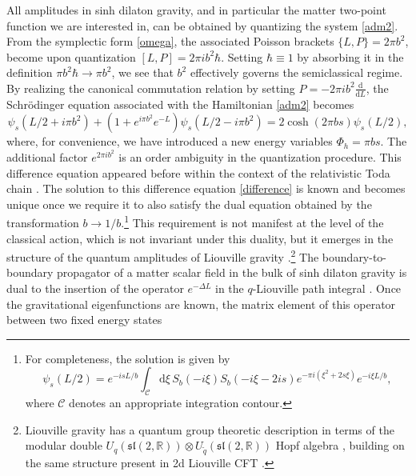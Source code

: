 \documentclass[a4paper,titlepage,12pt]{article}
\numberwithin{equation}{section}
\begin{document}
All amplitudes in sinh dilaton gravity, and in particular the matter two-point function we are interested in, can be obtained by quantizing the system \eqref{adm2}. From the symplectic form \eqref{omega}, the associated Poisson brackets $\{L,P\}=2\pi b^2$, become upon quantization $[L,P]=2\pi ib^2\hbar$. Setting $\hbar\equiv 1$ by absorbing it in the definition $\pi b^2\hbar\rightarrow \pi b^2$, we see that $b^2$ effectively governs the semiclassical regime. By realizing the canonical commutation relation by setting $P = -2 \pi i b^2 \frac{\mathrm{d}}{\mathrm{d}L}$, the Schrödinger equation associated with the Hamiltonian \eqref{adm2} becomes
\begin{equation}
\label{difference}
\psi_{s}(L/2+i \pi b^2)+\left(1+e^{i \pi b^2}e^{-L}\right)\psi_{s}(L/2-i \pi b^2)=2\cosh(2\pi b s)\psi_{s}(L/2),
\end{equation}
where, for convenience, we have introduced a new energy variables $\Phi_h=\pi bs$. The additional factor $e^{2\pi i b^2}$ is an order ambiguity in the quantization procedure. This difference equation appeared before within the context of the relativistic Toda chain \cite{Kharchev:2001rs}. The solution to this difference equation \eqref{difference} is known and becomes unique once we require it to also satisfy the dual equation obtained by the transformation $b \rightarrow 1/b$.\footnote{For completeness, the solution is given by \cite{Kharchev:2001rs,Mertens:2020hbs,Fan:2021bwt}
\begin{equation}
\psi_{s}(L/2) = e^{- i s L / b} \int_{\mathcal{C}} \mathrm{d}\xi \, S_{b}(-i \xi) S_{b}(-i \xi - 2i s) e^{-\pi i (\xi^2 + 2s \xi)} e^{- i \xi L / b},
\end{equation}
where $\mathcal{C}$ denotes an appropriate integration contour.} This requirement is not manifest at the level of the classical action, which is not invariant under this duality, but it emerges in the structure of the quantum amplitudes of Liouville gravity \cite{Mertens:2020hbs,Fan:2021bwt}.\footnote{Liouville gravity has a quantum group theoretic description in terms of the modular double $U_q(\mathfrak{sl}(2,\mathbb{R}))\otimes U_{\tilde{q}}(\mathfrak{sl}(2,\mathbb{R}))$ Hopf algebra \cite{Fan:2021bwt,Mertens:2022aou}, building on the same structure present in 2d Liouville CFT \cite{Ponsot:1999uf,Ponsot:2000mt}.} The boundary-to-boundary propagator of a matter scalar field in the bulk of sinh dilaton gravity is dual to the insertion of the operator 
$e^{- \Delta L}$ 
in the $q$-Liouville path integral \cite{Blommaert:2023wad}. Once the gravitational eigenfunctions are known, the matrix element of this operator between two fixed energy states 
\end{document}
